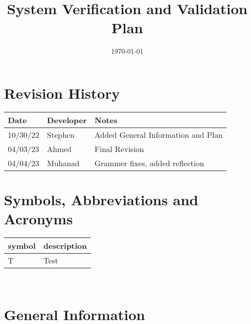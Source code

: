 \documentclass[12pt, titlepage]{article}
\begin{document}
\title{System Verification and Validation Plan \\\progname{}} 
\author{\authname}
\date{\today}
	
\maketitle


\section{Revision History}

\begin{tabularx}{\textwidth}{p{3cm}p{2cm}X}
\toprule {\bf Date} & {\bf Developer} & {\bf Notes}\\
\midrule
10/30/22 & Stephen & Added General Information and Plan\\
04/03/23 & Ahmed & Final Revision\\
04/04/23 & Muhanad & Grammer fixes, added reflection \\

\bottomrule
\end{tabularx}

\newpage

\tableofcontents



\newpage

\section{Symbols, Abbreviations and Acronyms}

\renewcommand{\arraystretch}{1.2}
\begin{tabular}{l l} 
  \toprule		
  \textbf{symbol} & \textbf{description}\\
  \midrule 
  T & Test\\
  \bottomrule
\end{tabular}\\


\newpage



\section{General Information}
\end{document}
